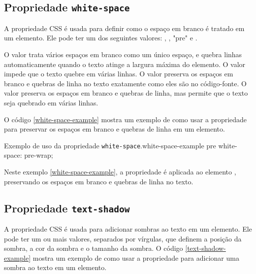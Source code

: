 \subsection{Propriedade \texttt{white-space}}

A propriedade CSS  é usada para definir como o espaço em branco é tratado em um elemento. Ele pode ter um dos seguintes valores: , , "pre" e .

O valor  trata vários espaços em branco como um único espaço, e quebra linhas automaticamente quando o texto atinge a largura máxima do elemento. O valor  impede que o texto quebre em várias linhas. O valor  preserva os espaços em branco e quebras de linha no texto exatamente como eles são no código-fonte. O valor  preserva os espaços em branco e quebras de linha, mas permite que o texto seja quebrado em várias linhas.

O código \ref{white-space-example} mostra um exemplo de como usar a propriedade  para preservar os espaços em branco e quebras de linha em um elemento.

\begin{csscode}{Exemplo de uso da propriedade \texttt{white-space}.}{white-space-example}
pre {
    white-space: pre-wrap;
}
\end{csscode}

Neste exemplo \ref{white-space-example}, a propriedade  é aplicada ao elemento , preservando os espaços em branco e quebras de linha no texto.

\subsection{Propriedade \texttt{text-shadow}}

A propriedade CSS  é usada para adicionar sombras ao texto em um elemento. Ele pode ter um ou mais valores, separados por vírgulas, que definem a posição da sombra, a cor da sombra e o tamanho da sombra. O código \ref{text-shadow-example} mostra um exemplo de como usar a propriedade  para adicionar uma sombra ao texto em um elemento.


